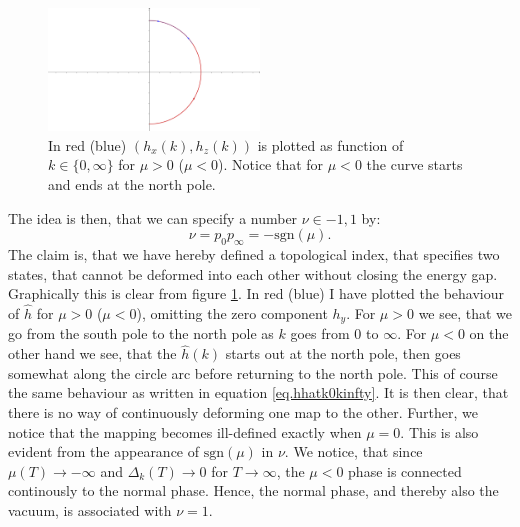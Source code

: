 \begin{figure} 
\begin{center}  
\includegraphics[width=0.5\textwidth]{Figures/Topologicalindex/topindex}  
\caption{In red (blue) $(h_x(k),h_z(k))$ is plotted as function of $k\in \{0, \infty\}$ for $\mu > 0$ ($\mu < 0$). Notice that for $\mu < 0$ the curve starts and ends at the north pole.}  
\label{fig.hhatplot}  
\end{center}    
\end{figure}


The idea is then, that we can specify a number $\nu \in {-1,1}$ by:
\begin{equation}
\nu = p_0p_{\infty} = -\text{sgn}(\mu).
\label{eq.topinvnudefition}
\end{equation}
The claim is, that we have hereby defined a topological index, that specifies two states, that cannot be deformed into each other without closing the energy gap. Graphically this is clear from figure \ref{fig.hhatplot}. In red (blue) I have plotted the behaviour of $\hat{h}$ for $\mu > 0$ ($\mu < 0$), omitting the zero component $h_y$. For $\mu > 0$ we see, that we go from the south pole to the north pole as $k$ goes from $0$ to $\infty$. For $\mu < 0$ on the other hand we see, that the $\hat{h}(k)$ starts out at the north pole, then goes somewhat along the circle arc before returning to the north pole. This of course the same behaviour as written in equation \eqref{eq.hhatk0kinfty}. It is then clear, that there is no way of continuously deforming one map to the other. Further, we notice that the mapping becomes ill-defined exactly when $\mu = 0$. This is also evident from the appearance of $\text{sgn}(\mu)$ in $\nu$. We notice, that since $\mu(T) \to -\infty$ and $\Delta_k(T)\to 0$ for $T\to \infty$, the $\mu < 0$ phase is connected continously to the normal phase. Hence, the normal phase, and thereby also the vacuum, is associated with $\nu = 1$. 

